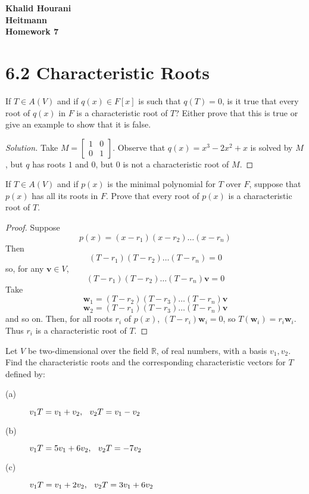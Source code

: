 \documentclass[12pt,leqno]{article}
\numberwithin{equation}{section}
\newcommand{\question}[2] {\vspace{.25in} \noindent\fbox{#1} #2 \vspace{.10in}}
\theoremstyle{definition}
\begin{document}
\thispagestyle{plain}
\begin{flushright}
\large{\textbf{Khalid Hourani\\
Heitmann\\
Homework 7\\
}}
\end{flushright}

\section*{6.2 Characteristic Roots}

\question{1}{If $T\in A(V)$ and if $q(x)\in F[x]$ is such that $q(T)=0$, is it true that every root of $q(x)$ in $F$ is a characteristic root of $T$? Either prove that this is true or give an example to show that it is false.}

\begin{proof}[Solution]
Take $M=\begin{bmatrix}1&0\\0&1\end{bmatrix}$. Observe that $q(x)=x^3-2x^2+x$ is solved by $M$, but $q$ has roots $1$ and $0$, but $0$ is not a characteristic root of $M$.
\end{proof}

\question{2}{If $T\in A(V)$ and if $p(x)$ is the minimal polynomial for $T$ over $F$, suppose that $p(x)$ has all its roots in $F$. Prove that every root of $p(x)$ is a characteristic root of $T$.}

\begin{proof}
Suppose \[p(x)=(x-r_1)(x-r_2)\hdots(x-r_n)\] Then \[(T-r_1)(T-r_2)\hdots(T-r_n)=0\] so, for any $\mathbf{v}\in V$, \[(T-r_1)(T-r_2)\hdots(T-r_n)\mathbf{v}=0\] Take \[\mathbf{w}_1=(T-r_2)(T-r_3)\hdots(T-r_n)\mathbf{v}\] \[\mathbf{w}_2=(T-r_1)(T-r_3)\hdots(T-r_n)\mathbf{v}\] and so on. Then, for all roots $r_i$ of $p(x)$, $(T-r_i)\mathbf{w}_i=0$, so $T(\mathbf{w}_i)=r_i\mathbf{w}_i$. Thus $r_i$ is a characteristic root of $T$. 
\end{proof}

\question{3}{Let $V$ be two-dimensional over the field $\mathbb{R}$, of real numbers, with a basis $v_1,v_2$. Find the characteristic roots and the corresponding characteristic vectors for $T$ defined by:}
\begin{description}
 \item [(a)] $v_1T=v_1+v_2,\hskip.1in v_2T=v_1-v_2$
 \item [(b)] $v_1T=5v_1+6v_2,\hskip.1in v_2T=-7v_2$
 \item [(c)] $v_1T=v_1+2v_2,\hskip.1in v_2T=3v_1+6v_2$
\end{description}
\end{document}
